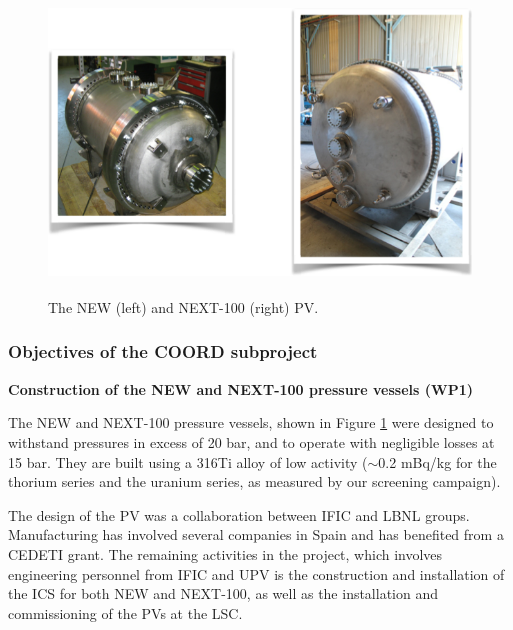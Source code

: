 %
%

\begin{figure}
\centering
\includegraphics[height=8cm]{img/PV.png}
\caption{The NEW (left) and NEXT-100 (right) PV.} \label{fig:PV}
\end{figure}


\subsubsection*{Objectives of the COORD subproject}

{\bf Construction of the NEW and NEXT-100 pressure vessels (WP1)}

The NEW and NEXT-100 pressure vessels, shown in Figure \ref{fig:PV} were designed to withstand pressures in excess of 20 bar, and to operate with negligible losses at 15 bar. They are built using a 316Ti alloy of low activity ($\sim$0.2 mBq/kg for the thorium series and 
the uranium series, as measured by our screening campaign). 

The design of the PV was a collaboration between IFIC and LBNL groups. Manufacturing has involved several companies in Spain and has benefited from a CEDETI grant. The remaining activities in the project, which involves engineering personnel from IFIC and UPV is the construction and installation of the ICS for both NEW and NEXT-100, as well as the installation and commissioning of the PVs at the LSC.

